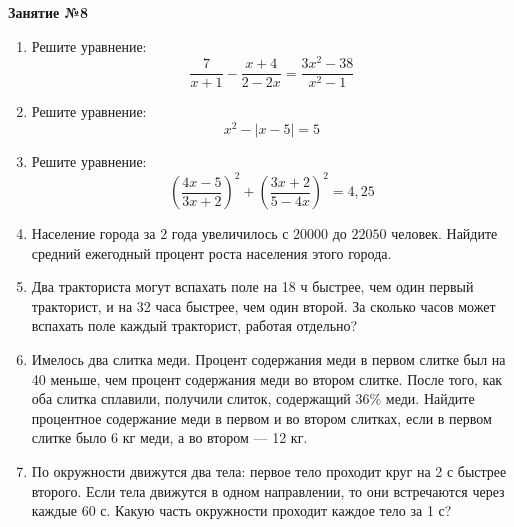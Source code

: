\documentclass[12pt, a4paper]{article}
\begin{document}
	
	   \cfoot{}
	\begin{center}
		\Large
		\textbf{Занятие №8}
	\end{center}
	\begin{enumerate}[label=\textbf{\arabic*.}]
		\item Решите уравнение: $$\dfrac{7}{x+1}-\dfrac{x+4}{2-2x}=\dfrac{3x^2-38}{x^2-1}$$
		\item Решите уравнение: $$x^2-|x-5|=5$$
		\item Решите уравнение: $$\left( \dfrac{4x-5}{3x+2} \right)^2+\left( \dfrac{3x+2}{5-4x} \right)^2=4,25$$
		\item Население города за \( 2 \) года увеличилось с \( 20 000 \) до \( 22 050 \) человек. Найдите средний ежегодный процент роста населения этого города.
		\item Два тракториста могут вспахать поле на 18 ч быстрее, чем один первый тракторист, и на 32 часа быстрее, чем один второй. За сколько часов может вспахать поле каждый тракторист, работая отдельно?
		\item Имелось два слитка меди. Процент содержания меди в первом слитке был на 40 меньше, чем процент содержания меди во втором слитке. После того, как оба слитка сплавили, получили слиток, содержащий 36\% меди. Найдите процентное содержание меди в первом и во втором слитках, если в первом слитке было 6 кг меди, а во втором --- 12 кг.
		\item По окружности движутся два тела: первое тело проходит круг на 2 с быстрее второго. Если тела движутся в одном направлении, то они встречаются через каждые 60 с. Какую часть окружности проходит каждое тело за 1 с?
	\end{enumerate}
\end{document}

